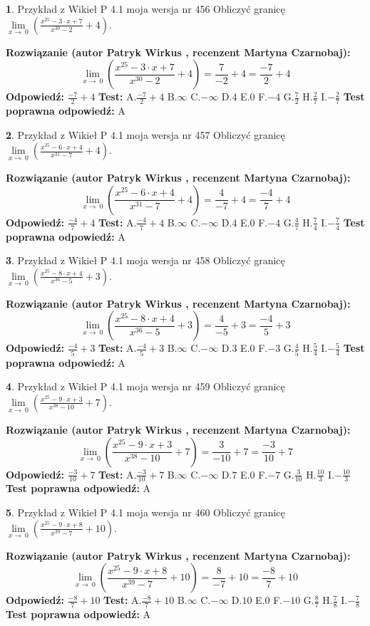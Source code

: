 \documentclass[12pt, a4paper]{article}
\theoremstyle{definition} %
\newtheorem{zad}{}
\newcommand{\zadStart}[1]{\begin{zad}#1\newline}
\newcommand{\zadStop}{\end{zad}}
\newcommand{\rozwStart}[2]{\noindent \textbf{Rozwiązanie (autor #1 , recenzent #2): }\newline}
\newcommand{\rozwStop}{\newline}
\newcommand{\odpStart}{\noindent \textbf{Odpowiedź:}\newline}
\newcommand{\odpStop}{\newline}
\newcommand{\testStart}{\noindent \textbf{Test:}\newline}
\newcommand{\testStop}{\newline}
\newcommand{\kluczStart}{\noindent \textbf{Test poprawna odpowiedź:}\newline}
\newcommand{\kluczStop}{\newline}
\begin{document}
\zadStart{Przykład z Wikieł P 4.1 moja wersja nr 456}
Obliczyć granicę $\lim\limits_{x\to\ 0}(\frac{x^{25}-3 \cdot x +7}{x^{30}-2}+4)$.
\zadStop
\rozwStart{Patryk Wirkus}{Martyna Czarnobaj}
$$\lim\limits_{x\to\ 0}(\frac{x^{25}-3 \cdot x +7}{x^{30}-2}+4)=\frac{7}{-2}+4=\frac{-7}{2}+4$$
\rozwStop
\odpStart
$\frac{-7}{2}+4$
\odpStop
\testStart
A.$\frac{-7}{2}+4$
B.$\infty$
C.$-\infty$
D.$4$
E.$0$
F.$-4$
G.$\frac{7}{2}$
H.$\frac{2}{7}$
I.$-\frac{2}{7}$
\testStop
\kluczStart
A
\kluczStop



\zadStart{Przykład z Wikieł P 4.1 moja wersja nr 457}
Obliczyć granicę $\lim\limits_{x\to\ 0}(\frac{x^{25}-6 \cdot x +4}{x^{31}-7}+4)$.
\zadStop
\rozwStart{Patryk Wirkus}{Martyna Czarnobaj}
$$\lim\limits_{x\to\ 0}(\frac{x^{25}-6 \cdot x +4}{x^{31}-7}+4)=\frac{4}{-7}+4=\frac{-4}{7}+4$$
\rozwStop
\odpStart
$\frac{-4}{7}+4$
\odpStop
\testStart
A.$\frac{-4}{7}+4$
B.$\infty$
C.$-\infty$
D.$4$
E.$0$
F.$-4$
G.$\frac{4}{7}$
H.$\frac{7}{4}$
I.$-\frac{7}{4}$
\testStop
\kluczStart
A
\kluczStop



\zadStart{Przykład z Wikieł P 4.1 moja wersja nr 458}
Obliczyć granicę $\lim\limits_{x\to\ 0}(\frac{x^{25}-8 \cdot x +4}{x^{36}-5}+3)$.
\zadStop
\rozwStart{Patryk Wirkus}{Martyna Czarnobaj}
$$\lim\limits_{x\to\ 0}(\frac{x^{25}-8 \cdot x +4}{x^{36}-5}+3)=\frac{4}{-5}+3=\frac{-4}{5}+3$$
\rozwStop
\odpStart
$\frac{-4}{5}+3$
\odpStop
\testStart
A.$\frac{-4}{5}+3$
B.$\infty$
C.$-\infty$
D.$3$
E.$0$
F.$-3$
G.$\frac{4}{5}$
H.$\frac{5}{4}$
I.$-\frac{5}{4}$
\testStop
\kluczStart
A
\kluczStop



\zadStart{Przykład z Wikieł P 4.1 moja wersja nr 459}
Obliczyć granicę $\lim\limits_{x\to\ 0}(\frac{x^{25}-9 \cdot x +3}{x^{38}-10}+7)$.
\zadStop
\rozwStart{Patryk Wirkus}{Martyna Czarnobaj}
$$\lim\limits_{x\to\ 0}(\frac{x^{25}-9 \cdot x +3}{x^{38}-10}+7)=\frac{3}{-10}+7=\frac{-3}{10}+7$$
\rozwStop
\odpStart
$\frac{-3}{10}+7$
\odpStop
\testStart
A.$\frac{-3}{10}+7$
B.$\infty$
C.$-\infty$
D.$7$
E.$0$
F.$-7$
G.$\frac{3}{10}$
H.$\frac{10}{3}$
I.$-\frac{10}{3}$
\testStop
\kluczStart
A
\kluczStop



\zadStart{Przykład z Wikieł P 4.1 moja wersja nr 460}
Obliczyć granicę $\lim\limits_{x\to\ 0}(\frac{x^{25}-9 \cdot x +8}{x^{39}-7}+10)$.
\zadStop
\rozwStart{Patryk Wirkus}{Martyna Czarnobaj}
$$\lim\limits_{x\to\ 0}(\frac{x^{25}-9 \cdot x +8}{x^{39}-7}+10)=\frac{8}{-7}+10=\frac{-8}{7}+10$$
\rozwStop
\odpStart
$\frac{-8}{7}+10$
\odpStop
\testStart
A.$\frac{-8}{7}+10$
B.$\infty$
C.$-\infty$
D.$10$
E.$0$
F.$-10$
G.$\frac{8}{7}$
H.$\frac{7}{8}$
I.$-\frac{7}{8}$
\testStop
\kluczStart
A
\kluczStop
\end{document}
